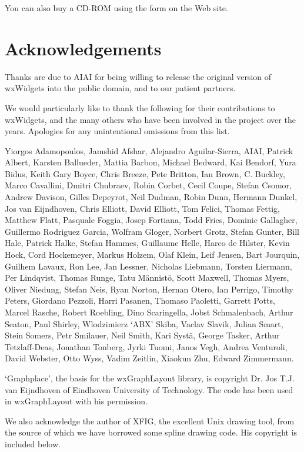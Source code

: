 You can also buy a CD-ROM using the form on the Web site.

\section{Acknowledgements}\label{acknowledgements}

Thanks are due to AIAI for being willing to release the original version of
wxWidgets into the public domain, and to our patient partners.

We would particularly like to thank the following for their contributions to wxWidgets, and the many others who have been involved in
the project over the years. Apologies for any unintentional omissions from this list. 
 
Yiorgos Adamopoulos, Jamshid Afshar, Alejandro Aguilar-Sierra, AIAI, 
Patrick Albert, Karsten Ballueder, Mattia Barbon, Michael Bedward, 
Kai Bendorf, Yura Bidus, Keith Gary Boyce, Chris Breeze, Pete Britton, 
Ian Brown, C. Buckley, Marco Cavallini, Dmitri Chubraev, Robin Corbet, Cecil Coupe, 
Stefan Csomor, Andrew Davison, Gilles Depeyrot, Neil Dudman, Robin Dunn, 
Hermann Dunkel, Jos van Eijndhoven, Chris Elliott, David Elliott, Tom Felici, 
Thomas Fettig, Matthew Flatt, Pasquale Foggia, Josep Fortiana, Todd Fries, 
Dominic Gallagher, Guillermo Rodriguez Garcia, Wolfram Gloger, Norbert Grotz, 
Stefan Gunter, Bill Hale, Patrick Halke, Stefan Hammes, Guillaume Helle, 
Harco de Hilster, Kevin Hock, Cord Hockemeyer, Markus Holzem, Olaf Klein, Leif Jensen, 
Bart Jourquin, Guilhem Lavaux, Ron Lee, Jan Lessner, Nicholas Liebmann, 
Torsten Liermann, Per Lindqvist, Thomas Runge, Tatu M\"{a}nnist\"{o}, 
Scott Maxwell, Thomas Myers, Oliver Niedung, Stefan Neis, Ryan Norton, Hernan Otero, 
Ian Perrigo, Timothy Peters, Giordano Pezzoli, Harri Pasanen, Thomaso Paoletti, 
Garrett Potts, Marcel Rasche, Robert Roebling, Dino Scaringella, 
Jobst Schmalenbach, Arthur Seaton, Paul Shirley, Wlodzimierz `ABX' Skiba, 
Vaclav Slavik, Julian Smart, Stein Somers, Petr Smilauer, Neil Smith, 
Kari Syst\"{a}, George Tasker, Arthur Tetzlaff-Deas, Jonathan Tonberg, 
Jyrki Tuomi, Janos Vegh, Andrea Venturoli, David Webster, Otto Wyss, 
Vadim Zeitlin, Xiaokun Zhu, Edward Zimmermann.

`Graphplace', the basis for the wxGraphLayout library, is copyright Dr. Jos
T.J. van Eijndhoven of Eindhoven University of Technology. The code has
been used in wxGraphLayout with his permission.

We also acknowledge the author of XFIG, the excellent Unix drawing tool,
from the source of which we have borrowed some spline drawing code.
His copyright is included below.

